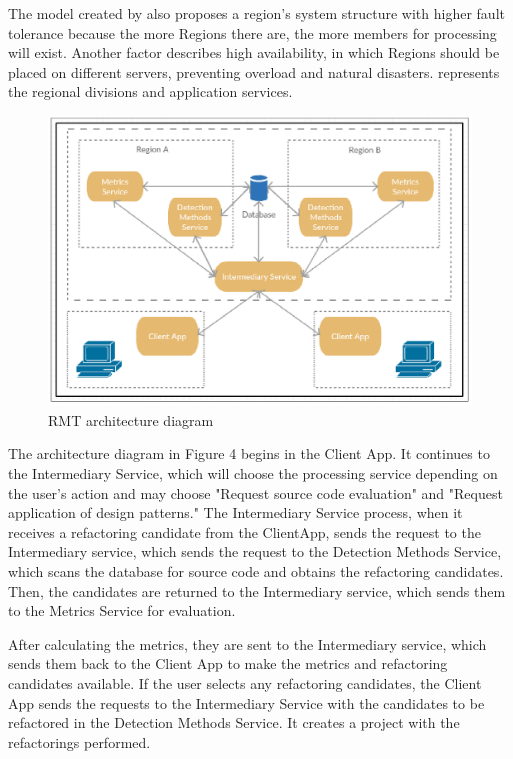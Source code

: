 The model created by \textcite{beluzzo2018abordagem} also proposes a region's system structure with higher fault tolerance because the more Regions there are, the more members for processing will exist. Another factor \textcite{beluzzo2018abordagem} describes high availability, in which Regions should be placed on different servers, preventing overload and natural disasters.  represents the regional divisions and application services.

\begin{figure}[ht!]
\SetCaptionWidth{\textwidth}
\caption{RMT architecture diagram}
\label{fig-architecture}
\includegraphics[width =\textwidth]{Chapter-2/Figures/schema.png}
\end{figure}


The architecture diagram in Figure 4 begins in the Client App. It continues to the Intermediary Service, which will choose the processing service depending on the user's action and may choose "Request source code evaluation" and "Request application of design patterns."
The Intermediary Service process, when it receives a refactoring candidate from the ClientApp, sends the request to the Intermediary service, which sends the request to the Detection Methods Service, which scans the database for source code and obtains the refactoring candidates. Then, the candidates are returned to the Intermediary service, which sends them to the Metrics Service for evaluation. 

After calculating the metrics, they are sent to the Intermediary service, which sends them back to the Client App to make the metrics and refactoring candidates available. If the user selects any refactoring candidates, the Client App sends the requests to the Intermediary Service with the candidates to be refactored in the Detection Methods Service. It creates a project with the refactorings performed.


